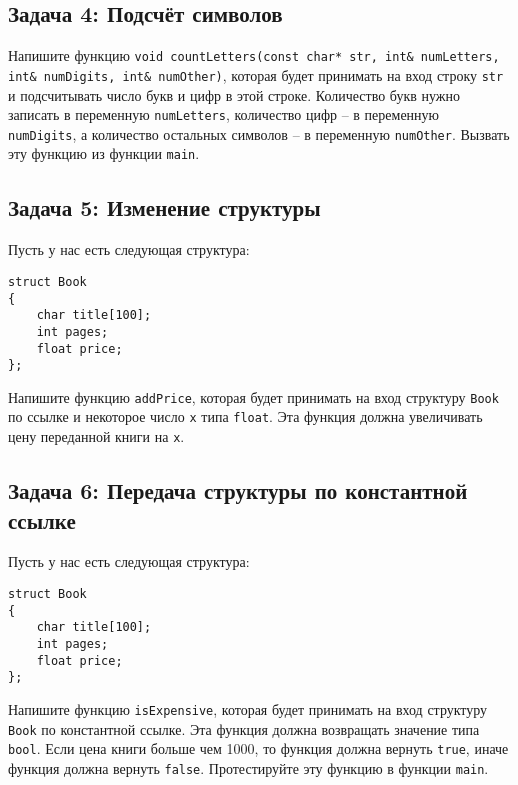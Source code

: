 \documentclass{article}
\begin{document}
\subsection*{Задача 4: Подсчёт символов}
Напишите функцию \texttt{void countLetters(const char* str, int\& numLetters, int\& numDigits, int\& numOther)}, которая будет принимать на вход строку \texttt{str} и подсчитывать число букв и цифр в этой строке. Количество букв нужно записать в переменную \texttt{numLetters}, количество цифр -- в переменную \texttt{numDigits}, а количество остальных символов -- в переменную \texttt{numOther}. Вызвать эту функцию из функции \texttt{main}.


\subsection*{Задача 5: Изменение структуры}
Пусть у нас есть следующая структура:
\begin{lstlisting}
struct Book
{
    char title[100];
    int pages;
    float price;
};
\end{lstlisting}

Напишите функцию \texttt{addPrice}, которая будет принимать на вход структуру \texttt{Book} по ссылке и некоторое число \texttt{x} типа \texttt{float}. Эта функция должна увеличивать цену переданной книги на \texttt{x}.


\subsection*{Задача 6: Передача структуры по константной ссылке}
Пусть у нас есть следующая структура:
\begin{lstlisting}
struct Book
{
    char title[100];
    int pages;
    float price;
};
\end{lstlisting}

Напишите функцию \texttt{isExpensive}, которая будет принимать на вход структуру \texttt{Book} по константной ссылке. Эта функция должна возвращать значение типа \texttt{bool}. Если цена книги больше чем 1000, то функция должна вернуть \texttt{true}, иначе функция должна вернуть \texttt{false}. Протестируйте эту функцию в функции \texttt{main}.
\end{document}

